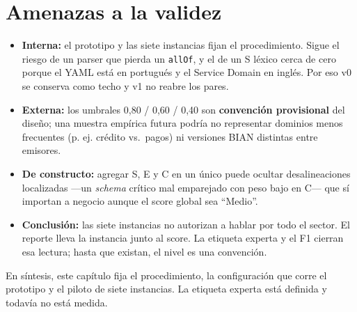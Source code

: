 \section{Amenazas a la validez}

\begin{itemize}
  \item \textbf{Interna:} el prototipo y las siete instancias fijan el procedimiento. Sigue el
        riesgo de un parser que pierda un \texttt{allOf}, y el de un S léxico cerca de cero
        porque el YAML está en portugués y el Service Domain en inglés. Por eso v0 se conserva
        como techo y v1 no reabre los pares.
  \item \textbf{Externa:} los umbrales 0,80 / 0,60 / 0,40 son \textbf{convención provisional} del
        diseño; una muestra empírica futura podría no representar dominios menos frecuentes (p. ej.
        crédito vs.\ pagos) ni versiones BIAN distintas entre emisores.
  \item \textbf{De constructo:} agregar S, E y C en un único \AlignmentScore{} puede ocultar
        desalineaciones localizadas ---un \textit{schema} crítico mal emparejado con peso bajo en
        C--- que sí importan a negocio aunque el score global sea ``Medio''.
  \item \textbf{Conclusión:} las siete instancias no autorizan a hablar por todo el sector. El
        reporte lleva la instancia junto al score. La etiqueta experta y el F1 cierran esa
        lectura; hasta que existan, el nivel es una convención.
\end{itemize}

En síntesis, este capítulo fija el procedimiento, la configuración que corre el prototipo y el
piloto de siete instancias. La etiqueta experta está definida y todavía no está medida.
